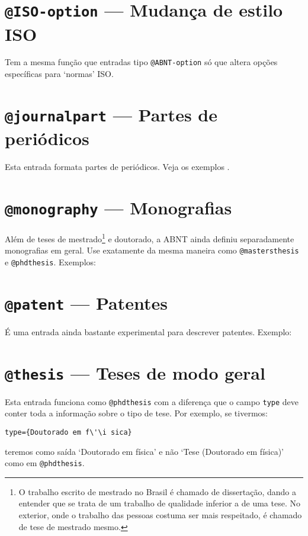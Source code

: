 \documentclass[espacosimples]{abnt}
\begin{document}
\section{{\tt @ISO-option} --- Mudança de estilo ISO}

Tem a mesma função que entradas tipo {\tt @ABNT-option} só que altera
opções específicas para `normas' ISO.

\section{{\tt @journalpart} --- Partes de periódicos }

Esta entrada formata partes de periódicos. Veja os exemplos
.

\section{{\tt @monography} --- Monografias}

Além de teses de mestrado\footnote{O trabalho escrito de mestrado no Brasil
é chamado de dissertação, dando a entender que se trata de um trabalho
de qualidade inferior a de uma tese. No exterior, onde o trabalho das pessoas
costuma ser mais respeitado, é chamado de tese de mestrado mesmo.}
 e doutorado, a ABNT ainda definiu separadamente monografias em geral.
Use exatamente da mesma maneira como {\tt @mastersthesis} e {\tt @phdthesis}.
Exemplos: 

\section{{\tt @patent} --- Patentes}

É uma entrada ainda bastante experimental para descrever patentes.
Exemplo: 

\section{{\tt @thesis} --- Teses de modo geral}

Esta entrada funciona como {\tt @phdthesis} com a diferença que o 
campo {\tt type} deve conter toda a informação sobre o tipo de tese. 
Por exemplo, se tivermos:
\begin{verbatim}
type={Doutorado em f\'\i sica}
\end{verbatim}
teremos como saída `Doutorado em física' e não
`Tese (Doutorado em física)' como em {\tt @phdthesis}.
\end{document}
